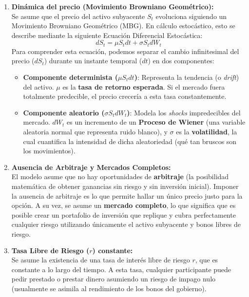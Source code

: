 \begin{enumerate}
    \item \textbf{Dinámica del precio (Movimiento Browniano Geométrico):}\\
    Se asume que el precio del activo subyacente $S_t$ evoluciona siguiendo un Movimiento Browniano Geométrico (MBG). En cálculo estocástico, esto se describe mediante la siguiente Ecuación Diferencial Estocástica:
    \begin{equation}
    dS_t = \mu S_t dt + \sigma S_t dW_t
    \end{equation}
    Para comprender esta ecuación, podemos separar el cambio infinitesimal del precio ($dS_t$) durante un instante temporal ($dt$) en dos componentes:
    \begin{itemize}
        \item \textbf{Componente determinista ($\mu S_t dt$)}: Representa la tendencia (o \textit{drift}) del activo. $\mu$ es la \textbf{tasa de retorno esperada}. Si el mercado fuera totalmente predecible, el precio crecería a esta tasa constantemente.
        \item \textbf{Componente aleatorio ($\sigma S_t dW_t$)}: Modela los \textit{shocks} impredecibles del mercado. $dW_t$ es un incremento de un \textbf{Proceso de Wiener} (una variable aleatoria normal que representa ruido blanco), y $\sigma$ es la \textbf{volatilidad}, la cual cuantifica la intensidad de dicha aleatoriedad (qué tan bruscos son los movimientos).
    \end{itemize}
    
    \item \textbf{Ausencia de Arbitraje y Mercados Completos:}\\
    El modelo asume que no hay oportunidades de \textbf{arbitraje} (la posibilidad matemática de obtener ganancias sin riesgo y sin inversión inicial). Imponer la ausencia de arbitraje es lo que permite hallar un único precio justo para la opción. A su vez, se asume un \textbf{mercado completo}, lo que significa que es posible crear un portafolio de inversión que replique y cubra perfectamente cualquier riesgo utilizando únicamente el activo subyacente y bonos libres de riesgo.
    
    \item \textbf{Tasa Libre de Riesgo ($r$) constante:}\\
    Se asume la existencia de una tasa de interés libre de riesgo $r$, que es constante a lo largo del tiempo. A esta tasa, cualquier participante puede pedir prestado o prestar dinero asumiendo un riesgo de impago nulo (usualmente se asimila al rendimiento de los bonos del gobierno).
    

\end{enumerate}

